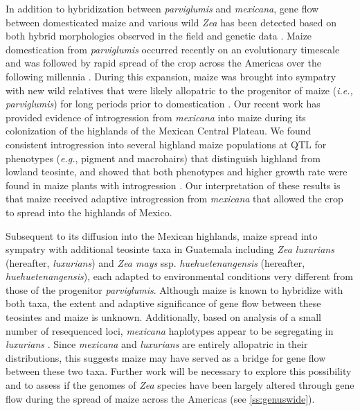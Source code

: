 In addition to hybridization between \emph{parviglumis} and \emph{mexicana}, gene flow between domesticated maize and various wild \emph{Zea} has been detected based on both hybrid morphologies observed in the field \citep{wilkes1967teosinte, Wilkes1977} and genetic data \citep{Fukunaga2005,Ross-Ibarra2009a,vanheerwaarden2011a}. 
Maize domestication from \emph{parviglumis} occurred recently on an evolutionary timescale \citep[$\sim$9,000BP;][]{Matsuoka2002} and was followed by rapid spread of the crop across the Americas over the following millennia \citep{Piperno2001,Grobman2012}. 
During this expansion, maize was brought into sympatry with new wild relatives that were likely allopatric to the progenitor of maize (\emph{i.e., parviglumis}) for long periods prior to domestication \citep{hufford2012inferences}. 
Our recent work has provided evidence of introgression from \emph{mexicana} into maize during its colonization of the highlands of the Mexican Central Plateau.  
We found consistent introgression into several highland maize populations at QTL for phenotypes (\emph{e.g.}, pigment and macrohairs) that distinguish highland \zm{} from lowland \zp{} teosinte, and showed that both \zm{} phenotypes and higher growth rate were found in maize plants with \zm{}  introgression \citep{Hufford2013}.
Our interpretation of these results is that maize received adaptive introgression from \emph{mexicana} that allowed the crop to spread into the highlands of Mexico. 

Subsequent to its diffusion into the Mexican highlands, maize spread into sympatry with additional teosinte taxa in Guatemala including \emph{Zea luxurians} (hereafter, \emph{luxurians}) and \emph{Zea mays} ssp. \emph{huehuetenangensis} (hereafter, \emph{huehuetenangensis}), each adapted to environmental conditions very different from those of the progenitor \emph{parviglumis}. 
Although maize is known to hybridize with both taxa, the extent and adaptive significance of gene flow between these teosintes and maize is unknown.  
Additionally, based on analysis of a small number of resequenced loci, \emph{mexicana} haplotypes appear to be segregating in \emph{luxurians} \citep{Ross-Ibarra2009a}.  
Since \emph{mexicana} and \emph{luxurians} are entirely allopatric in their distributions, this suggests maize may have served as a bridge for gene flow between these two taxa.  
Further work will be necessary to explore this possibility and to assess if the genomes of \emph{Zea} species have been largely altered through gene flow during the spread of maize across the Americas (see \ref{ss:genuswide}).


